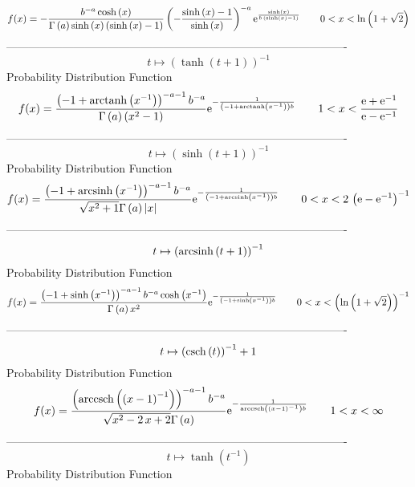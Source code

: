 \documentclass[12pt]{article}
\begin{document}
$$  f(x)=-{\frac {{b}^{-a}\cosh \left( x \right) }{\Gamma \left( a \right) 
\sinh \left( x \right)  \left( \sinh \left( x \right) -1 \right) }
 \left( -{\frac {\sinh \left( x \right) -1}{\sinh \left( x \right) }}
 \right) ^{-a}{{\rm e}^{{\frac {\sinh \left( x \right) }{b\, \left( 
\sinh \left( x \right) -1 \right) }}}}}
 \qquad0
 < x < \ln  \left( 1+\sqrt {2} \right) 
$$-------------------------------------------------------------------------------------------  \\$$t\mapsto  \left( \tanh \left( t+1 \right)  \right) ^{-1}
$$Probability Distribution Function 
$$  f(x)={\frac { \left( -1+{\rm arctanh} \left({x}^{-1}\right) \right) ^{-a-1}
{b}^{-a}}{\Gamma \left( a \right)  \left( {x}^{2}-1 \right) }{{\rm e}^
{-{\frac {1}{ \left( -1+{\rm arctanh} \left({x}^{-1}\right) \right) b}
}}}}
 \qquad1
 < x < {\frac {{\rm e}+{{\rm e}^{-1}}}{{\rm e}-{{\rm e}^{-1}}}}
$$-------------------------------------------------------------------------------------------  \\$$t\mapsto  \left( \sinh \left( t+1 \right)  \right) ^{-1}
$$Probability Distribution Function 
$$  f(x)={\frac { \left( -1+{\rm arcsinh} \left({x}^{-1}\right) \right) ^{-a-1}
{b}^{-a}}{\sqrt {{x}^{2}+1}\Gamma \left( a \right)  \left| x \right| }
{{\rm e}^{-{\frac {1}{ \left( -1+{\rm arcsinh} \left({x}^{-1}\right)
 \right) b}}}}}
 \qquad0
 < x < 2\, \left( {\rm e}-{{\rm e}^{-1}} \right) ^{-1}
$$-------------------------------------------------------------------------------------------  \\$$t\mapsto  \left( {\rm arcsinh} \left(t+1\right) \right) ^{-1}
$$Probability Distribution Function 
$$  f(x)={\frac { \left( -1+\sinh \left( {x}^{-1} \right)  \right) ^{-a-1}{b}^{
-a}\cosh \left( {x}^{-1} \right) }{\Gamma \left( a \right) {x}^{2}}{
{\rm e}^{-{\frac {1}{ \left( -1+\sinh \left( {x}^{-1} \right) 
 \right) b}}}}}
 \qquad0
 < x <  \left( \ln  \left( 1+\sqrt {2} \right)  \right) ^{-1}
$$-------------------------------------------------------------------------------------------  \\$$t\mapsto  \left( {\rm csch} \left(t\right) \right) ^{-1}+1
$$Probability Distribution Function 
$$  f(x)={\frac { \left( {\rm arccsch} \left( \left( x-1 \right) ^{-1}\right)
 \right) ^{-a-1}{b}^{-a}}{\sqrt {{x}^{2}-2\,x+2}\Gamma \left( a
 \right) }{{\rm e}^{-{\frac {1}{{\rm arccsch} \left( \left( x-1
 \right) ^{-1}\right)b}}}}}
 \qquad1
 < x < \infty 
$$-------------------------------------------------------------------------------------------  \\$$t\mapsto \tanh \left( {t}^{-1} \right) 
$$Probability Distribution Function 
\end{document}
